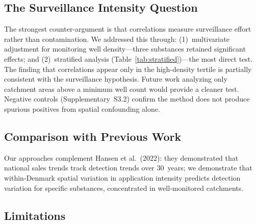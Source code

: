 \documentclass[12pt,a4paper]{article}
\begin{document}
\subsection{The Surveillance Intensity Question}

The strongest counter-argument is that correlations measure surveillance effort rather than contamination. We addressed this through: (1)~multivariate adjustment for monitoring well density---three substances retained significant effects; and (2)~stratified analysis (Table~\ref{tab:stratified})---the most direct test. The finding that correlations appear only in the high-density tertile is partially consistent with the surveillance hypothesis. Future work analyzing only catchment areas above a minimum well count would provide a cleaner test. Negative controls (Supplementary~S3.2) confirm the method does not produce spurious positives from spatial confounding alone.

\subsection{Comparison with Previous Work}

Our approaches complement Hansen et al.\ (2022): they demonstrated that national sales trends track detection trends over 30~years; we demonstrate that within-Denmark spatial variation in application intensity predicts detection variation for specific substances, concentrated in well-monitored catchments.

\subsection{Limitations}
\end{document}

